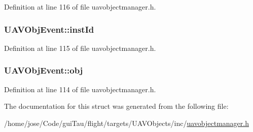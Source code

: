 Definition at line 116 of file uavobjectmanager.\-h.

\hypertarget{struct_u_a_v_obj_event_ad55867963dc4e2172799430c0b2323d8}{
\subsubsection[{inst\-Id}]{ U\-A\-V\-Obj\-Event\-::inst\-Id}}\label{struct_u_a_v_obj_event_ad55867963dc4e2172799430c0b2323d8}


Definition at line 115 of file uavobjectmanager.\-h.

\hypertarget{struct_u_a_v_obj_event_a716555d74d08184a3807881d9ade9232}{
\subsubsection[{obj}]{ U\-A\-V\-Obj\-Event\-::obj}}\label{struct_u_a_v_obj_event_a716555d74d08184a3807881d9ade9232}


Definition at line 114 of file uavobjectmanager.\-h.



The documentation for this struct was generated from the following file\-:\begin{DoxyCompactItemize}
\item 
/home/jose/\-Code/gui\-Tau/flight/targets/\-U\-A\-V\-Objects/inc/\hyperlink{targets_2_u_a_v_objects_2inc_2uavobjectmanager_8h}{uavobjectmanager.\-h}\end{DoxyCompactItemize}
